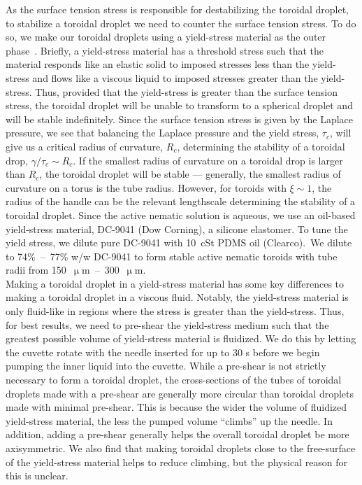 As the surface tension stress is responsible for destabilizing the toroidal droplet, to stabilize a toroidal droplet we need to counter the surface tension stress.
To do so, we make our toroidal droplets using a yield-stress material as the outer phase~\cite{RN47,RN258}.
Briefly, a yield-stress material has a threshold stress such that the material responds like an elastic solid to imposed stresses less than the yield-stress and flows like a viscous liquid to imposed stresses greater than the yield-stress.
Thus, provided that the yield-stress is greater than the surface tension stress, the toroidal droplet will be unable to transform to a spherical droplet and will be stable indefinitely.
Since the surface tension stress is given by the Laplace pressure, we see that balancing the Laplace pressure and the yield stress, $\tau_c$, will give us a critical radius of curvature, $R_c$, determining the stability of a toroidal drop, $\gamma/\tau_c \sim R_c$.
If the smallest radius of curvature on a toroidal drop is larger than $R_c$, the toroidal droplet will be stable --- generally, the smallest radius of curvature on a torus is the tube radius.
However, for toroids with $\xi \sim 1$, the radius of the handle can be the relevant lengthscale determining the stability of a toroidal droplet.
Since the active nematic solution is aqueous, we use an oil-based yield-stress material, DC-9041 (Dow Corning), a silicone elastomer.
To tune the yield stress, we dilute pure DC-9041 with 10~cSt PDMS oil (Clearco).\
We dilute to 74\%~--~77\% w/w DC-9041 to form stable active nematic toroids with tube radii from 150~$\upmu$m~--~300~$\upmu$m.\\

Making a toroidal droplet in a yield-stress material has some key differences to making a toroidal droplet in a viscous fluid.
Notably, the yield-stress material is only fluid-like in regions where the stress is greater than the yield-stress.
Thus, for best results, we need to pre-shear the yield-stress medium such that the greatest possible volume of yield-stress material is fluidized.
We do this by letting the cuvette rotate with the needle inserted for up to 30 s before we begin pumping the inner liquid into the cuvette.
While a pre-shear is not strictly necessary to form a toroidal droplet, the cross-sections of the tubes of toroidal droplets made with a pre-shear are generally more circular than toroidal droplets made with minimal pre-shear.
This is because the wider the volume of fluidized yield-stress material, the less the pumped volume ``climbs'' up the needle.
In addition, adding a pre-shear generally helps the overall toroidal droplet be more axisymmetric.
We also find that making toroidal droplets close to the free-surface of the yield-stress material helps to reduce climbing, but the physical reason for this is unclear.\\


